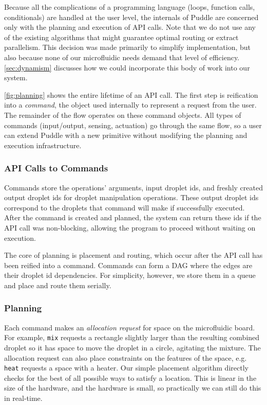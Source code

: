 \documentclass{jpaper}
\begin{document}
Because all the complications of a programming language (loops, function calls, conditionals) are handled at the user level, the internals of Puddle are concerned only with the planning and execution of API calls.
Note that we do not use any of the existing algorithms that might guarantee optimal routing or extract parallelism.
This decision was made primarily to simplify implementation, but also because none of our microfluidic needs demand that level of efficiency.
\autoref{sec:dynamism} discusses how we could incorporate this body of work into our system.

\autoref{fig:planning} shows the entire lifetime of an API call.
The first step is reification into a \emph{command}, the object used internally to represent a request from the user.
The remainder of the flow operates on these command objects.
All types of commands (input/output, sensing, actuation) go through the same flow, so a user can extend Puddle with a new primitive without modifying the planning and execution infrastructure.

\subsubsection{API Calls to Commands}

Commands store the operations' arguments, input droplet ids, and freshly created output droplet ids for droplet manipulation operations.
These output droplet ids correspond to the droplets that command will make if successfully executed.
After the command is created and planned, the system can return these ids if the API call was non-blocking, allowing the program to proceed without waiting on execution.


The core of planning is placement and routing, which occur after the API call has been reified into a command.
Commands can form a DAG where the edges are their droplet id dependencies.
For simplicity, however, we store them in a queue and place and route them serially.

\subsubsection{Planning}
\label{sec:planning-planning}

Each command makes an \emph{allocation request} for space on the microfluidic board.
For example, \lstinline{mix} requests a rectangle slightly larger than the resulting combined droplet so it has space to move the droplet in a circle, agitating the mixture.
The allocation request can also place constraints on the features of the space, e.g. \lstinline{heat} requests a space with a heater.
Our simple placement algorithm directly checks for the best of all possible ways to satisfy a location.
This is linear in the size of the hardware, and the hardware is small, so practically we can still do this in real-time.
\end{document}

